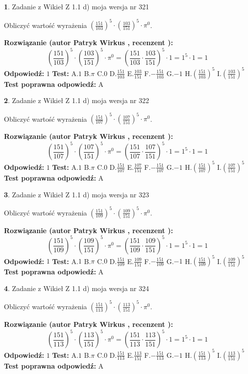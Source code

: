 \documentclass[12pt, a4paper]{article}
\theoremstyle{definition} %
\newtheorem{zad}{}
\newcommand{\zadStart}[1]{\begin{zad}#1\newline}
\newcommand{\zadStop}{\end{zad}}
\newcommand{\rozwStart}[2]{\noindent \textbf{Rozwiązanie (autor #1 , recenzent #2): }\newline}
\newcommand{\rozwStop}{\newline}
\newcommand{\odpStart}{\noindent \textbf{Odpowiedź:}\newline}
\newcommand{\odpStop}{\newline}
\newcommand{\testStart}{\noindent \textbf{Test:}\newline}
\newcommand{\testStop}{\newline}
\newcommand{\kluczStart}{\noindent \textbf{Test poprawna odpowiedź:}\newline}
\newcommand{\kluczStop}{\newline}
\begin{document}
\zadStart{Zadanie z Wikieł Z 1.1 d) moja wersja nr 321}

Obliczyć wartość wyrażenia $(\frac{151}{103})^{5} \cdot (\frac{103}{151})^{5} \cdot \pi^{0}$.
\zadStop
\rozwStart{Patryk Wirkus}{}
$$(\frac{151}{103})^{5} \cdot (\frac{103}{151})^{5} \cdot \pi^{0} = (\frac{151}{103} \cdot \frac{103}{151})^{5} \cdot 1 = 1^{5} \cdot 1 = 1$$
\rozwStop
\odpStart
$1$
\odpStop
\testStart
A.$1$ B.$\pi$ C.$0$ D.$\frac{151}{103}$ E.$\frac{103}{151}$
F.$-\frac{151}{103}$ G.$-1$
H.$(\frac{151}{103})^{5}$
I.$(\frac{103}{151})^{5}$
\testStop
\kluczStart
A
\kluczStop



\zadStart{Zadanie z Wikieł Z 1.1 d) moja wersja nr 322}

Obliczyć wartość wyrażenia $(\frac{151}{107})^{5} \cdot (\frac{107}{151})^{5} \cdot \pi^{0}$.
\zadStop
\rozwStart{Patryk Wirkus}{}
$$(\frac{151}{107})^{5} \cdot (\frac{107}{151})^{5} \cdot \pi^{0} = (\frac{151}{107} \cdot \frac{107}{151})^{5} \cdot 1 = 1^{5} \cdot 1 = 1$$
\rozwStop
\odpStart
$1$
\odpStop
\testStart
A.$1$ B.$\pi$ C.$0$ D.$\frac{151}{107}$ E.$\frac{107}{151}$
F.$-\frac{151}{107}$ G.$-1$
H.$(\frac{151}{107})^{5}$
I.$(\frac{107}{151})^{5}$
\testStop
\kluczStart
A
\kluczStop



\zadStart{Zadanie z Wikieł Z 1.1 d) moja wersja nr 323}

Obliczyć wartość wyrażenia $(\frac{151}{109})^{5} \cdot (\frac{109}{151})^{5} \cdot \pi^{0}$.
\zadStop
\rozwStart{Patryk Wirkus}{}
$$(\frac{151}{109})^{5} \cdot (\frac{109}{151})^{5} \cdot \pi^{0} = (\frac{151}{109} \cdot \frac{109}{151})^{5} \cdot 1 = 1^{5} \cdot 1 = 1$$
\rozwStop
\odpStart
$1$
\odpStop
\testStart
A.$1$ B.$\pi$ C.$0$ D.$\frac{151}{109}$ E.$\frac{109}{151}$
F.$-\frac{151}{109}$ G.$-1$
H.$(\frac{151}{109})^{5}$
I.$(\frac{109}{151})^{5}$
\testStop
\kluczStart
A
\kluczStop



\zadStart{Zadanie z Wikieł Z 1.1 d) moja wersja nr 324}

Obliczyć wartość wyrażenia $(\frac{151}{113})^{5} \cdot (\frac{113}{151})^{5} \cdot \pi^{0}$.
\zadStop
\rozwStart{Patryk Wirkus}{}
$$(\frac{151}{113})^{5} \cdot (\frac{113}{151})^{5} \cdot \pi^{0} = (\frac{151}{113} \cdot \frac{113}{151})^{5} \cdot 1 = 1^{5} \cdot 1 = 1$$
\rozwStop
\odpStart
$1$
\odpStop
\testStart
A.$1$ B.$\pi$ C.$0$ D.$\frac{151}{113}$ E.$\frac{113}{151}$
F.$-\frac{151}{113}$ G.$-1$
H.$(\frac{151}{113})^{5}$
I.$(\frac{113}{151})^{5}$
\testStop
\kluczStart
A
\kluczStop
\end{document}
